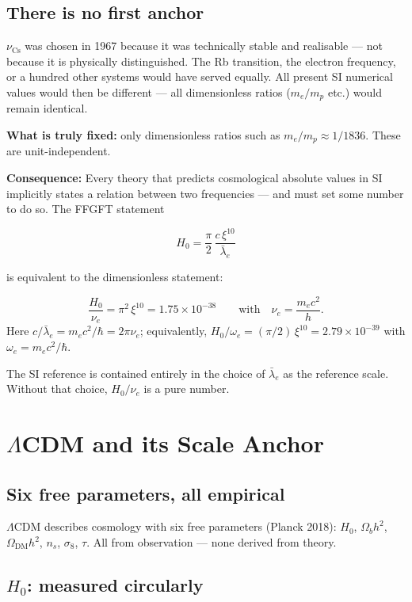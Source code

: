 \section{There is no first anchor}

$\nu_\text{Cs}$ was chosen in 1967 because it was technically stable
and realisable — not because it is physically distinguished. The Rb
transition, the electron frequency, or a hundred other systems would
have served equally. All present SI numerical values would then be
different — all dimensionless ratios ($m_e/m_p$ etc.) would remain
identical.

\textbf{What is truly fixed:} only dimensionless ratios such as
$m_e/m_p \approx 1/1836$. These are unit-independent.

\textbf{Consequence:} Every theory that predicts cosmological absolute
values in SI implicitly states a relation between two frequencies —
and must set some number to do so. The FFGFT statement

\[
  H_0 = \frac{\pi}{2}\,\frac{c\,\xi^{10}}{\bar\lambda_e}
\]

is equivalent to the dimensionless statement:

\[
  \frac{H_0}{\nu_e} = \pi^2\,\xi^{10} = 1.75\times10^{-38}
  \qquad\text{with}\quad \nu_e = \frac{m_e c^2}{h}.
\]
Here $c/\bar\lambda_e = m_ec^2/\hbar = 2\pi\nu_e$; equivalently,
$H_0/\omega_e = (\pi/2)\,\xi^{10} = 2.79\times10^{-39}$ with $\omega_e = m_ec^2/\hbar$.

The SI reference is contained entirely in the choice of $\bar\lambda_e$
as the reference scale. Without that choice, $H_0/\nu_e$ is a pure
number.

\chapter{$\Lambda$CDM and its Scale Anchor}

\section{Six free parameters, all empirical}

$\Lambda$CDM describes cosmology with six free parameters (Planck 2018):
$H_0$, $\Omega_b h^2$, $\Omega_\text{DM} h^2$, $n_s$, $\sigma_8$,
$\tau$. All from observation — none derived from theory.

\section{$H_0$: measured circularly}

